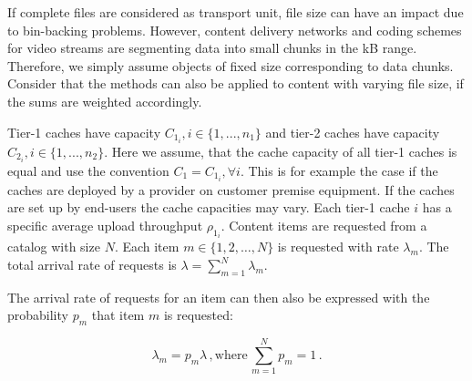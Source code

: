If complete files are considered as transport unit, file size can have an impact due to bin-backing problems.
However, content delivery networks and coding schemes for video streams are segmenting data into small chunks in the kB range.
Therefore, we simply assume objects of fixed size corresponding to data chunks.
Consider that the methods can also be applied to content with varying file size, if the sums are weighted accordingly.

Tier-1 caches have capacity $C_{1_i}, i\in\{1,...,n_1\}$ and tier-2 caches have capacity $C_{2_i}, i\in\{1,...,n_2\}$.
Here we assume, that the cache capacity of all tier-1 caches is equal and use the convention $C_1=C_{1_i}, \forall i$.
This is for example the case if the caches are deployed by a provider on customer premise equipment.
If the caches are set up by end-users the cache capacities may vary.
Each tier-1 cache $i$ has a specific average upload throughput $\rho_{1_i}$.
Content items are requested from a catalog with size $N$.
Each item $m\in \{1,2,\dots,N\}$ is requested with rate $\lambda_m$.
The total arrival rate of requests is $\lambda=\sum_{m=1}^N \lambda_m$.

The arrival rate of requests for an item can then also be expressed with the probability $p_m$ that item $m$ is requested:

\begin{equation}
\lambda_m = p_m \lambda \, , \text{where} \, \sum_{m=1}^N p_m = 1 \, .
\end{equation}



